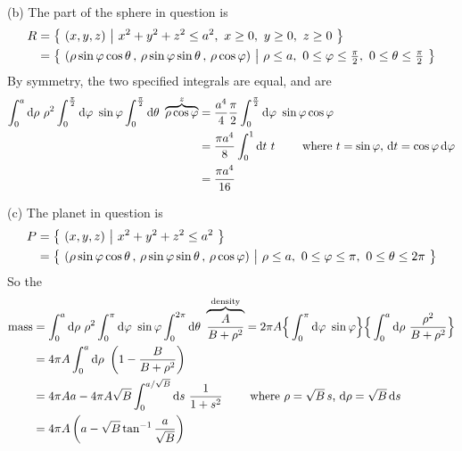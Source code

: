 \begin{solution}
(b) The part of the sphere in question is
\begin{align*}
R&=\big\{ \ (x,y,z)\ \big|\ x^2+y^2+z^2\le a^2,\ x\ge0,\ y\ge 0,\ z\ge 0\ \big\} \\
 &=\big\{ \ (\rho\sin\varphi\cos\theta\,,\,
         \rho\sin\varphi\sin\theta\,,\,
         \rho\cos\varphi)\ \big|\ \rho\le a,\ 0\le\varphi\le\tfrac{\pi}{2},
             \ 0\le\theta\le\tfrac{\pi}{2}\ \big\} 
\end{align*}
By symmetry, the two specified integrals are equal, and are
\begin{align*}
 \int_{0}^{a}\dee{\rho}\ \rho^2 \int_0^{{\pi\over 2}}\dee{\varphi}\ \sin\varphi
\int_{0}^{{\pi\over 2}} \dee{\theta}\ \overbrace{\rho\cos\varphi}^{z}
&=\frac{a^4}{4}\frac{\pi}{2} \int_0^{{\pi\over 2}}\dee{\varphi}\ 
\sin\varphi\cos\varphi \\
&=\frac{\pi a^4}{8} \int_0^{1}\dee{t}\ t\qquad\hbox{ where $t=\sin\varphi$,
$\dee{t}=\cos\varphi\,\dee{\varphi}$} \\
&=\frac{\pi a^4}{16}
\end{align*}

(c) The planet in question is
\begin{align*}
P&=\big\{ \ (x,y,z)\ \big|\ x^2+y^2+z^2\le a^2\ \big\} \\
 &=\big\{ \ (\rho\sin\varphi\cos\theta\,,\,
         \rho\sin\varphi\sin\theta\,,\,
         \rho\cos\varphi)\ \big|\ \rho\le a,\ 0\le\varphi\le\pi,
             \ 0\le\theta\le2\pi\ \big\} 
\end{align*}
So the
\begin{align*}
\text{mass}
&= \int_{0}^{a}\dee{\rho}\ \rho^2 \int_0^{\pi}\dee{\varphi}\ \sin\varphi
\int_{0}^{2\pi} \dee{\theta}\ \overbrace{\frac{A}{B+\rho^2}}^{\rm density}
=2\pi A\Big\{ \int_0^{\pi}\dee{\varphi}\ \sin\varphi\Big\}
\Big\{\int_{0}^{a}\dee{\rho}\ \frac{\rho^2}{B+\rho^2} \Big\} \\
&=4\pi A\int_{0}^{a}\dee{\rho}\ \left(1-\frac{B}{B+\rho^2} \right) \\
&=4\pi Aa-4\pi A\sqrt{B}\int_{0}^{a/\sqrt{B}}\dee{s}\ \frac{1}{1+s^2} 
\qquad\hbox{ where $\rho=\sqrt{B}\,s$,
$\dee{\rho}=\sqrt{B}\,\dee{s}$} \\
&=4\pi A\left(a-\sqrt{B}\tan^{-1}\frac{a}{\sqrt{B}}\right)
\end{align*}


\end{solution}
